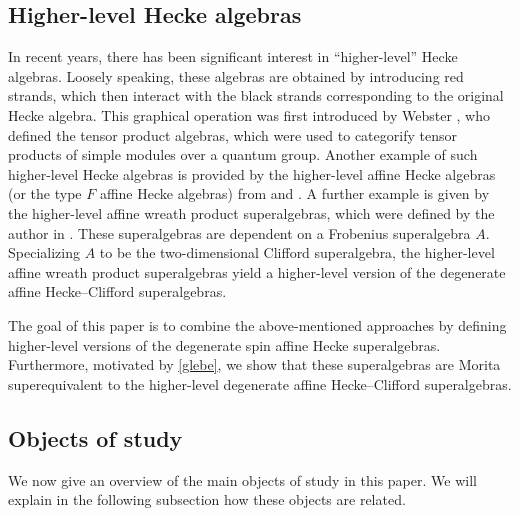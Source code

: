 \documentclass[11pt]{amsart}
\theoremstyle{definition}
\numberwithin{equation}{section}
\begin{document}
\subsection{Higher-level Hecke algebras}

In recent years, there has been significant interest in ``higher-level'' Hecke algebras. Loosely speaking, these algebras are obtained by introducing red strands, which then interact with the black strands corresponding to the original Hecke algebra. This graphical operation was first introduced by Webster \cite{Webster}, who defined the tensor product algebras, which were used to categorify tensor products of simple modules over a quantum group. Another example of such higher-level Hecke algebras is provided by the higher-level affine Hecke algebras (or the type \(F\) affine Hecke algebras) from \cite[Def.~2.7]{Maksimau-Stroppel} and \cite[Def.~5.5]{Webster2}. A further example is given by the higher-level affine wreath product superalgebras, which were defined by the author in \cite{Moran}. These superalgebras are dependent on a Frobenius superalgebra \(A\). Specializing \(A\) to be the two-dimensional Clifford superalgebra, the higher-level affine wreath product superalgebras yield a higher-level version of the degenerate affine Hecke--Clifford superalgebras.

The goal of this paper is to combine the above-mentioned approaches by defining higher-level versions of the degenerate spin affine Hecke superalgebras. Furthermore, motivated by \cref{glebe}, we show that these superalgebras are Morita superequivalent to the higher-level degenerate affine Hecke--Clifford superalgebras.


\subsection{Objects of study} 

We now give an overview of the main objects of study in this paper. We will explain in the following subsection how these objects are related. 
\end{document}
